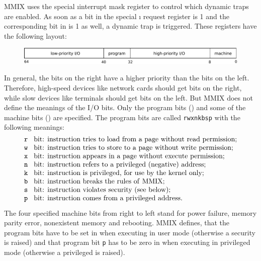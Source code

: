 MMIX uses the special \i{interrupt mask register}  to control which dynamic traps are enabled. As soon as a bit in the special \i{ request register}  is 1 and the corresponding bit in  is 1 as well, a dynamic trap is triggered. These registers have the following layout:
\begin{figure}[H]
	\centering
	\includegraphics[width=\textwidth]{img/rKrQ-crop.pdf}
\end{figure}
\vspace{-20pt}
\noindent In general, the bits on the right have a higher priority than the bits on the left. Therefore, high-speed devices like network cards should get bits on the right, while slow devices like terminals should get bits on the left. But MMIX does not define the meanings of the I/O bits. Only the program bits () and some of the machine bits () are specified. The program bits are called {\tt rwxnkbsp} with the following meanings:
$$\vbox{\halign{{\tt #} bit: &#\hfil\cr
r	&	instruction tries to load from a page without read permission;\cr
w	&	instruction tries to store to a page without write permission;\cr
x	&	instruction appears in a page without execute permission;\cr
n	&	instruction refers to a privileged (negative) address;\cr
k	&	instruction is privileged, for use by the kernel only;\cr
b	&	instruction breaks the rules of\/ MMIX;\cr
s	&	instruction violates security (see below);\cr
p	&	instruction comes from a privileged address.\cr}}$$
The four specified machine bits from right to left stand for power failure, memory parity error, nonexistent memory and rebooting. MMIX defines, that the program bits have to be set in  when executing in user mode (otherwise a security  is raised) and that program bit {\tt p} has to be zero in  when executing in privileged mode (otherwise a privileged  is raised). \citep[pg. 29]{mmix-doc}

